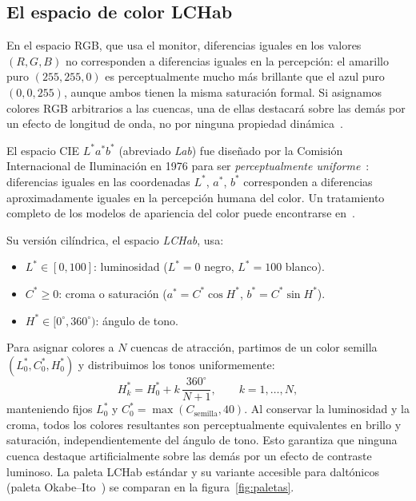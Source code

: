 \documentclass[11pt,a4paper]{article}
\theoremstyle{plain}
\theoremstyle{definition}
\theoremstyle{remark}
\begin{document}
\subsection{El espacio de color LCHab}

En el espacio RGB, que usa el monitor, diferencias iguales en los
valores $(R,G,B)$ no corresponden a diferencias iguales en la percepción:
el amarillo puro $(255,255,0)$ es perceptualmente mucho más brillante
que el azul puro $(0,0,255)$, aunque ambos tienen la misma saturación
formal.
Si asignamos colores RGB arbitrarios a las cuencas, una de ellas
destacará sobre las demás por un efecto de longitud de onda, no por
ninguna propiedad dinámica~\cite{Zeileis2009}.

El espacio CIE $L^*a^*b^*$ (abreviado \emph{Lab}) fue diseñado por la
Comisión Internacional de Iluminación en 1976 para ser
\emph{perceptualmente uniforme}~\cite{Schanda2007}: diferencias iguales
en las coordenadas $L^*$, $a^*$, $b^*$ corresponden a diferencias
aproximadamente iguales en la percepción humana del color.
Un tratamiento completo de los modelos de apariencia del color puede
encontrarse en~\cite{Fairchild2013}.

Su versión cilíndrica, el espacio \emph{LCHab}, usa:
\begin{itemize}
  \item $L^*\in[0,100]$: luminosidad ($L^*=0$ negro, $L^*=100$ blanco).
  \item $C^*\geq 0$: croma o saturación ($a^*=C^*\cos H^*$,\;
        $b^*=C^*\sin H^*$).
  \item $H^*\in[0^\circ,360^\circ)$: ángulo de tono.
\end{itemize}

Para asignar colores a $N$ cuencas de atracción, partimos de un color
semilla $(L_0^*, C_0^*, H_0^*)$ y distribuimos los tonos uniformemente:
\[
  H_k^* = H_0^* + k\,\frac{360^\circ}{N+1}, \qquad k=1,\ldots,N,
\]
manteniendo fijos $L_0^*$ y $C_0^*=\max(C_{\text{semilla}},40)$.
Al conservar la luminosidad y la croma, todos los colores resultantes
son perceptualmente equivalentes en brillo y saturación, independientemente
del ángulo de tono.
Esto garantiza que ninguna cuenca destaque artificialmente sobre las
demás por un efecto de contraste luminoso.
La paleta LCHab estándar y su variante accesible para daltónicos (paleta Okabe--Ito~\cite{OkabeIto2008}) se comparan en la figura~\ref{fig:paletas}.
\end{document}
